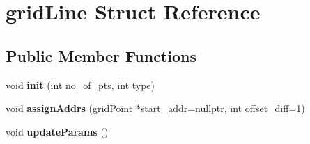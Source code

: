 \hypertarget{structgridLine}{\section{grid\-Line Struct Reference}
\label{structgridLine}
}
\subsection*{Public Member Functions}
\begin{DoxyCompactItemize}
\item 
\hypertarget{structgridLine_a7a18615917f0eac76afab32739f94850}{void {\bfseries init} (int no\-\_\-of\-\_\-pts, int type)}\label{structgridLine_a7a18615917f0eac76afab32739f94850}

\item 
\hypertarget{structgridLine_a7272c7473adde2902ff86db92c5b550e}{void {\bfseries assign\-Addrs} (\hyperlink{structgridPoint}{grid\-Point} $\ast$start\-\_\-addr=nullptr, int offset\-\_\-diff=1)}\label{structgridLine_a7272c7473adde2902ff86db92c5b550e}

\item 
\hypertarget{structgridLine_a3b59b87a28f59ed0c0670e704d53ad90}{void {\bfseries update\-Params} ()}\label{structgridLine_a3b59b87a28f59ed0c0670e704d53ad90}

\end{DoxyCompactItemize}
